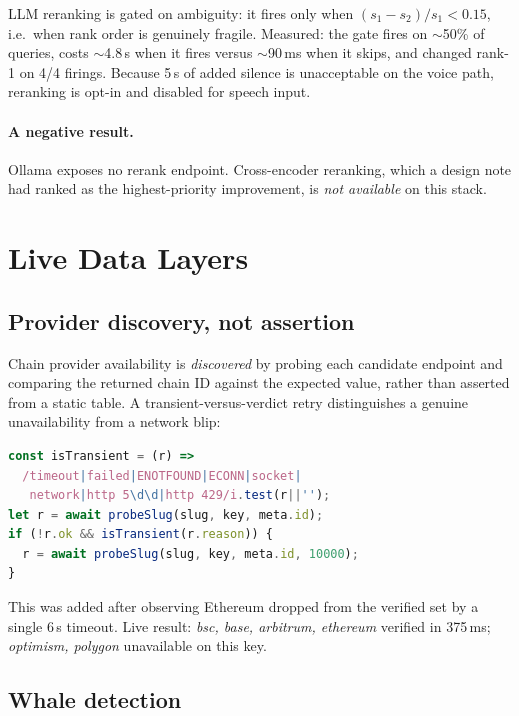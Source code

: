\documentclass[10pt,twocolumn]{article}
\begin{document}
LLM reranking is gated on ambiguity: it fires only when $(s_1 - s_2)/s_1 < 0.15$, i.e.\
when rank order is genuinely fragile. Measured: the gate fires on $\sim$50\% of queries,
costs $\sim$4.8\,s when it fires versus $\sim$90\,ms when it skips, and changed rank-1 on
4/4 firings. Because 5\,s of added silence is unacceptable on the voice path, reranking
is opt-in and disabled for speech input.

\paragraph{A negative result.} Ollama exposes no rerank endpoint. Cross-encoder
reranking, which a design note had ranked as the highest-priority improvement, is
\emph{not available} on this stack.

\section{Live Data Layers}
\label{sec:data}

\subsection{Provider discovery, not assertion}

Chain provider availability is \emph{discovered} by probing each candidate endpoint and
comparing the returned chain ID against the expected value, rather than asserted from a
static table. A transient-versus-verdict retry distinguishes a genuine unavailability from
a network blip:

\begin{lstlisting}[language=JavaScript]
const isTransient = (r) =>
  /timeout|failed|ENOTFOUND|ECONN|socket|
   network|http 5\d\d|http 429/i.test(r||'');
let r = await probeSlug(slug, key, meta.id);
if (!r.ok && isTransient(r.reason)) {
  r = await probeSlug(slug, key, meta.id, 10000);
}
\end{lstlisting}

This was added after observing Ethereum dropped from the verified set by a single 6\,s
timeout. Live result: \emph{bsc, base, arbitrum, ethereum} verified in 375\,ms;
\emph{optimism, polygon} unavailable on this key.

\subsection{Whale detection}
\end{document}
